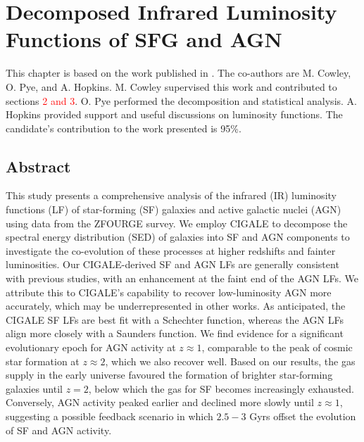 \chapter{Decomposed Infrared Luminosity Functions of SFG and AGN}

\begin{adjustwidth}{2cm}{0cm}
    This chapter is based on the work published in \cite{lyon_decomposing_2024}. The co-authors are M. Cowley, O. Pye, and A. Hopkins. M. Cowley supervised this work and contributed to sections \textcolor{red}{2 and 3}. O. Pye performed the decomposition and statistical analysis. A. Hopkins provided support and useful discussions on luminosity functions. The candidate's contribution to the work presented is 95\%.
\end{adjustwidth}

\section{Abstract}
This study presents a comprehensive analysis of the infrared (IR) luminosity functions (LF) of star-forming (SF) galaxies and active galactic nuclei (AGN) using data from the ZFOURGE survey. We employ CIGALE to decompose the spectral energy distribution (SED) of galaxies into SF and AGN components to investigate the co-evolution of these processes at higher redshifts and fainter luminosities. Our CIGALE-derived SF and AGN LFs are generally consistent with previous studies, with an enhancement at the faint end of the AGN LFs. We attribute this to CIGALE's capability to recover low-luminosity AGN more accurately, which may be underrepresented in other works. As anticipated, the CIGALE SF LFs are best fit with a Schechter function, whereas the AGN LFs align more closely with a Saunders function. We find evidence for a significant evolutionary epoch for AGN activity at $z \approx 1$, comparable to the peak of cosmic star formation at $z \approx 2$, which we also recover well. Based on our results, the gas supply in the early universe favoured the formation of brighter star-forming galaxies until $z=2$, below which the gas for SF becomes increasingly exhausted. Conversely, AGN activity peaked earlier and declined more slowly until $z \approx 1$, suggesting a possible feedback scenario in which $2.5-3$ Gyrs offset the evolution of SF and AGN activity. 